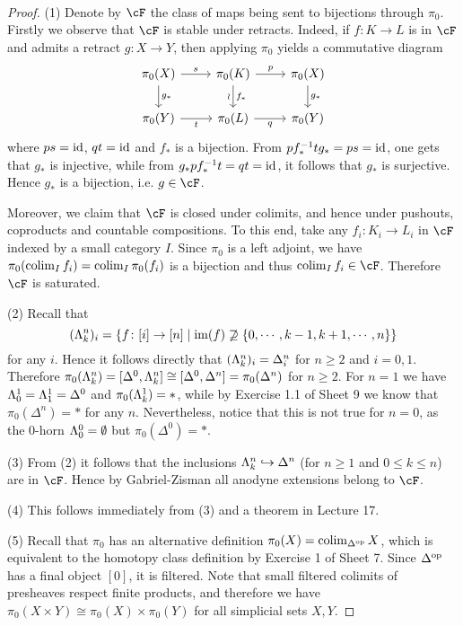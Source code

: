 \documentclass[a4paper,11pt,openany]{scrartcl}
\begin{document}
~\\
\begin{proof}
(1) Denote by $\cF$ the class of maps being sent to bijections through $\pi_0$. Firstly we observe that $\cF$ is stable under retracts. Indeed, if $f\colon K\to L$ is in $\cF$ and admits a retract $g\colon X\to Y$, then applying $\pi_0$ yields a commutative diagram
\[
\begin{tikzcd}
\pi_0(X)\arrow[r,"s"]\arrow[d,"g_*"]& \pi_0(K)\arrow[d,"f_*", "\wr"']\arrow[r,"p"]& \pi_0(X)\arrow[d,"g_*"]\\
\pi_0(Y)\arrow[r,"t"']& \pi_0(L)\arrow[r,"q"']& \pi_0(Y)
\end{tikzcd}
\]
where $ps=\operatorname{id}$, $qt=\operatorname{id}$ and $f_*$ is a bijection. From $pf_*^{-1}tg_*=ps=\operatorname{id}$, one gets that $g_*$ is injective, while from $g_*pf_*^{-1}t=qt=\operatorname{id}$, it follows that $g_*$ is surjective. Hence $g_*$ is a bijection, i.e. $g\in\cF$. 

Moreover, we claim that $\cF$ is closed under colimits, and hence under pushouts, coproducts and countable compositions. To this end, take any $f_i\colon K_i\to L_i$ in $\cF$ indexed by a small category $I$. Since $\pi_0$ is a left adjoint, we have $\pi_0(\operatorname{colim}_If_i)=\operatorname{colim}_I\pi_0(f_i)$ is a bijection and thus $\colim_If_i\in\cF$. Therefore $\cF$ is saturated.

(2) Recall that
\[
(\Lambda^n_k)_i=\{f\colon[i]\to[n]\mid\operatorname{im}(f)\not\supseteq\{0,\cdots,k-1,k+1,\cdots,n\}\}
\]
for any $i$. Hence it follows directly that $(\Lambda^n_k)_i=\Delta^n_i$ for $n\geqslant2$ and $i=0,1$. Therefore $\pi_0(\Lambda^n_k)=[\Delta^0,\Lambda^n_k]\cong[\Delta^0,\Delta^n]=\pi_0(\Delta^n)$ for $n\geqslant2$. For $n=1$ we have $\Lambda^1_0=\Lambda^1_1=\Delta^0$ and $\pi_0(\Lambda^1_k)=*$, while by Exercise 1.1 of Sheet 9 we know that $\pi_0(\Delta^n)=*$ for any $n$. Nevertheless, notice that this is not true for $n=0$, as the $0$-horn $\Lambda^0_0=\emptyset$ but $\pi_0(\Delta^0)=*$.

(3) From (2) it follows that the inclusions $\Lambda^n_k\hookrightarrow\Delta^n$ (for $n\geqslant1$ and $0\leqslant k\leqslant n$) are in $\cF$. Hence by Gabriel-Zisman all anodyne extensions belong to $\cF$.

(4) This follows immediately from (3) and a theorem in Lecture 17.

(5) Recall that $\pi_0$ has an alternative definition $\pi_0(X)=\operatorname{colim}_{\Delta^{\operatorname{op}}}X$, which is equivalent to the homotopy class definition by Exercise 1 of Sheet 7. Since $\Delta^{\operatorname{op}}$ has a final object $[0]$, it is filtered. Note that small filtered colimits of presheaves respect finite products, and therefore we have $\pi_0(X\times Y)\cong\pi_0(X)\times\pi_0(Y)$ for all simplicial sets $X,Y$.
\end{proof}
\end{document}
